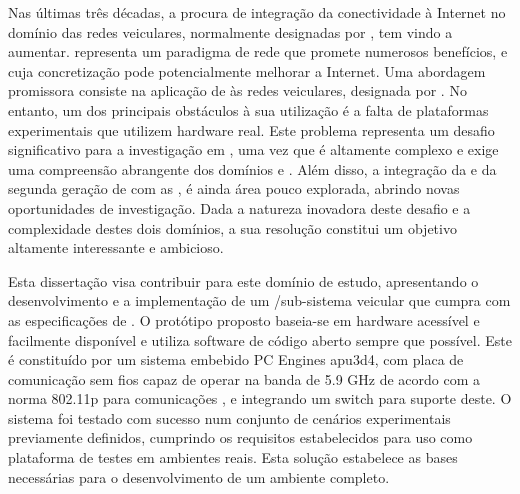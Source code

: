 
%

Nas últimas três décadas, a procura de integração da conectividade à Internet no domínio das redes veiculares, normalmente designadas por , tem vindo a aumentar.  representa um paradigma de rede que promete numerosos benefícios, e cuja concretização pode potencialmente melhorar a Internet. Uma abordagem promissora consiste na aplicação de  às redes veiculares, designada por . No entanto, um dos principais obstáculos à sua utilização é a falta de plataformas experimentais que utilizem hardware real. Este problema representa um desafio significativo para a investigação em , uma vez que é altamente complexo e exige uma compreensão abrangente dos domínios  e . Além disso, a integração da  e da segunda geração de  com as , é ainda área pouco explorada, abrindo novas oportunidades de investigação. Dada a natureza inovadora deste desafio e a complexidade destes dois domínios, a sua resolução constitui um objetivo altamente interessante e ambicioso.

Esta dissertação visa contribuir para este domínio de estudo, apresentando o desenvolvimento e a implementação de um /sub-sistema  veicular que cumpra com as especificações de . 
O protótipo proposto baseia-se em hardware acessível e facilmente disponível e utiliza software de código aberto sempre que possível. %
Este é constituído por um sistema embebido PC Engines apu3d4, com placa de comunicação sem fios capaz de operar na banda de 5.9 GHz de acordo com a norma  802.11p para comunicações , e integrando um switch   para suporte deste. O sistema foi testado com sucesso num conjunto de cenários experimentais previamente definidos, cumprindo os requisitos estabelecidos para uso como plataforma de testes em ambientes reais. Esta solução estabelece as bases necessárias para o desenvolvimento de um ambiente  completo.



